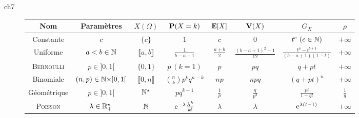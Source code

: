 \cite{acamanes} ch7
\begin{figure*}
    \begingroup
    \renewcommand{\arraystretch}{1.5} %
    \begin{tabular}{|c|c|c|c|c|c|c|c|}
        \hline
        Nom & Paramètres & $X(\Omega)$ & $\P(X=k)$ & $\E[X]$ & $\V(X)$ & $G_X$ & $\rho$\\
        \hline \hline
        Constante & $c$ & $\{c\}$ & $1$ & $c$ & $0$ & $t^c\ (c \in \N)$ & $+\infty$ \\
        \hline
        Uniforme & $a < b \in \N$ & $\llbracket a, b \rrbracket$ & $\frac{1}{b-a+1}$ & $\frac{a+b}{2}$ & $\frac{(b-a+1)^2 - 1}{12}$ & $\frac{t^a - t^{b+1}}{(b-a+1)(1-t)}$ & $+\infty$ \\
        \hline
        \textsc{Bernoulli} & $p \in ]0, 1[$ & $\{0, 1\}$ & $p\ (k=1)$ & $p$ & $pq$ & $q + pt$ & $+\infty$ \\
        \hline
        Binomiale & $(n, p) \in \N \times ]0, 1[$ & $\llbracket 0, n \rrbracket$ & $\binom{n}{k} p^k q^{n-k}$ & $np$ & $npq$ & $(q + pt)^n$ & $+\infty$ \\
        \hline
        Géométrique & $p \in ]0, 1[$ & $\Ne$ & $pq^{k-1}$ & $\frac{1}{p}$ & $\frac{q}{p^2}$ & $\frac{pt}{1-qt}$ & $\frac{1}{q}$ \\
        \hline
        \textsc{Poisson} & $\lambda \in \Rpe$ & $\N$ & $\me^{-\lambda} \frac{\lambda^k}{k!}$ & $\lambda$ & $\lambda$ & $\me^{\lambda(t-1)}$ & $+\infty$ \\
        \hline
    \end{tabular}
    \endgroup
\end{figure*}


